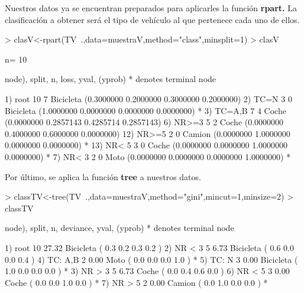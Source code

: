 \documentclass [a4paper] {article}
\begin{document}
\bigskip
Nuestros datos ya se encuentran preparados para aplicarles la función \textbf{rpart.} La clasificación a obtener será el tipo de
vehículo al que pertenece cada uno de ellos.
\begin{Schunk}
\begin{Sinput}
> clasV<-rpart(TV~.,data=muestraV,method="class",minsplit=1)
> clasV
\end{Sinput}
\begin{Soutput}
n= 10 

node), split, n, loss, yval, (yprob)
      * denotes terminal node

 1) root 10 7 Bicicleta (0.3000000 0.2000000 0.3000000 0.2000000)  
   2) TC=N 3 0 Bicicleta (1.0000000 0.0000000 0.0000000 0.0000000) *
   3) TC=A,B 7 4 Coche (0.0000000 0.2857143 0.4285714 0.2857143)  
     6) NR>=3 5 2 Coche (0.0000000 0.4000000 0.6000000 0.0000000)  
      12) NR>=5 2 0 Camion (0.0000000 1.0000000 0.0000000 0.0000000) *
      13) NR< 5 3 0 Coche (0.0000000 0.0000000 1.0000000 0.0000000) *
     7) NR< 3 2 0 Moto (0.0000000 0.0000000 0.0000000 1.0000000) *
\end{Soutput}
\end{Schunk}

\bigskip
Por último, se aplica la función \textbf{tree} a nuestros datos.
\begin{Schunk}
\begin{Sinput}
> classTV<-tree(TV~.,data=muestraV,method="gini",mincut=1,minsize=2)
> classTV
\end{Sinput}
\begin{Soutput}
node), split, n, deviance, yval, (yprob)
      * denotes terminal node

1) root 10 27.32 Bicicleta ( 0.3 0.2 0.3 0.2 )  
  2) NR < 3 5  6.73 Bicicleta ( 0.6 0.0 0.0 0.4 )  
    4) TC: A,B 2  0.00 Moto ( 0.0 0.0 0.0 1.0 ) *
    5) TC: N 3  0.00 Bicicleta ( 1.0 0.0 0.0 0.0 ) *
  3) NR > 3 5  6.73 Coche ( 0.0 0.4 0.6 0.0 )  
    6) NR < 5 3  0.00 Coche ( 0.0 0.0 1.0 0.0 ) *
    7) NR > 5 2  0.00 Camion ( 0.0 1.0 0.0 0.0 ) *
\end{Soutput}
\end{Schunk}
\end{document}
